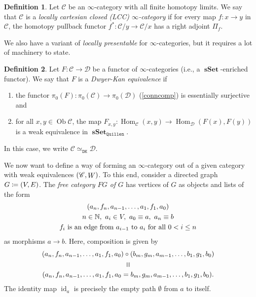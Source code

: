 \documentclass[10pt,letterpaper,cm]{nupset}
\theoremstyle{definition}
\newtheorem{definition}{Definition}[subsection]
\theoremstyle{theorem}
\theoremstyle{remark}
\newcommand{\vequiv}{\rotatebox[origin=c]{-90}{$\equiv$}}
\DeclareMathOperator{\ob}{Ob}
\newcommand{\0}{\mathbf{0}}
\newcommand{\1}{\mathbf{1}}
\newcommand{\2}{\mathbf{2}}
\DeclareMathOperator{\sset}{\mathbf{sSet}}
\renewcommand{\c}{\mathscr{C}}
\renewcommand{\d}{\mathscr{D}}
\newcommand{\N}{\mathbb N}
\DeclareMathOperator{\Hom}{Hom}
\DeclareMathOperator{\idd}{id}
\DeclareMathOperator{\we}{\mathnormal{W}}
\newcommand{\be}{\begin{enumerate}}
\newcommand{\ee}{\end{enumerate}}
\begin{document}
\smallskip

\begin{definition}
Let $\c$ be an $\infty$-category with all finite homotopy limits. We say that $\c$ is a \textit{locally cartesian closed (LCC) $\infty$-category} if for every map $f: x \to y$ in $\c$, the homotopy pullback functor $f^{\ast}: \c/y \to \c/x$ has a right adjoint $\Pi_f$.
\end{definition}

\medskip

We also have a variant of \textit{locally presentable} for $\infty$-categories, but it requires a lot of machinery to state.


\begin{definition}
Let $F : \c \to \d$ be a functor of $\infty$-categories (i.e., a $\sset$-enriched functor). We say that $F$ is a \textit{Dwyer-Kan equivalence} if 
\be[label=(\roman*)]
\item the functor $\pi_0(F) : \pi_0(\c) \to \pi_0(\d)$ (\cref{conncomp}) is essentially surjective and
\item for all $x,y\in \ob{\c}$, the map $F_{x,y} : \Hom_{\c}(x,y) \to \Hom_{\d}(F(x), F(y))$ is a weak equivalence in $\sset_{\mathtt{Quillen}}$.
\ee
In this case, we write $\c \simeq_{\mathtt{DK}} \d$.
\end{definition}

\medskip

We now want to define a way of forming an $\infty$-category out of a given category with weak equivalences $\mleft(\c, \we\mright)$. To this end, consider a  directed graph $G\coloneqq \mleft(V, E\mright)$. The \textit{free category $F{G}$ of $G$} has vertices of $G$ as objects and lists of the form
\begin{gather*}
\mleft(a_n,f_n,a_{n-1},\ldots,a_{1},f_1,a_0\mright)
\\  n\in \N, \ a_i \in V, \ a_0 \equiv a, \ a_n \equiv b
\\ f_i \text{ is an edge from $a_{i-1}$ to $a_i$ for all $0< i \leq n$} 
\end{gather*}
as morphisms $a\to b$. Here, composition is given by
\begin{gather*}
 \mleft(a_n,f_n,a_{n-1},\ldots,a_{1},f_1,a_0\mright)\circ \mleft(b_m,g_m,a_{m-1},\ldots,b_{1},g_1,b_0\mright) 
\\ \vequiv
\\ \mleft(a_n,f_n,a_{n-1},\ldots,a_{1},f_1,a_0= b_m,g_m,a_{m-1},\ldots,b_{1},g_1,b_0\mright). 
\end{gather*}
The identity map $\idd_a$ is precisely the empty path $\emptyset$ from $a$ to itself.
\end{document}
